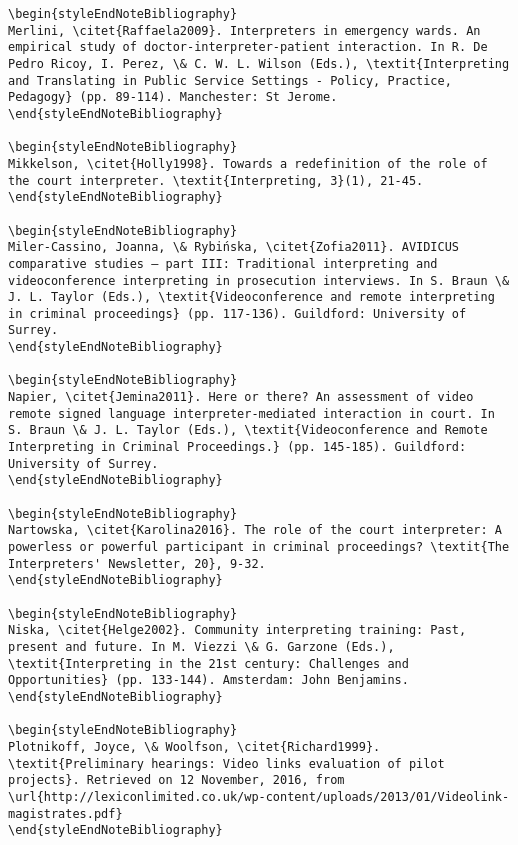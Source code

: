 \documentclass[output=paper]{langsci/langscibook}
\begin{document}
\begin{verbatim}
\begin{styleEndNoteBibliography}
Merlini, \citet{Raffaela2009}. Interpreters in emergency wards. An empirical study of doctor-interpreter-patient interaction. In R. De Pedro Ricoy, I. Perez, \& C. W. L. Wilson (Eds.), \textit{Interpreting and Translating in Public Service Settings - Policy, Practice, Pedagogy} (pp. 89-114). Manchester: St Jerome.
\end{styleEndNoteBibliography}

\begin{styleEndNoteBibliography}
Mikkelson, \citet{Holly1998}. Towards a redefinition of the role of the court interpreter. \textit{Interpreting, 3}(1), 21-45. 
\end{styleEndNoteBibliography}

\begin{styleEndNoteBibliography}
Miler-Cassino, Joanna, \& Rybińska, \citet{Zofia2011}. AVIDICUS comparative studies – part III: Traditional interpreting and videoconference interpreting in prosecution interviews. In S. Braun \& J. L. Taylor (Eds.), \textit{Videoconference and remote interpreting in criminal proceedings} (pp. 117-136). Guildford: University of Surrey.
\end{styleEndNoteBibliography}

\begin{styleEndNoteBibliography}
Napier, \citet{Jemina2011}. Here or there? An assessment of video remote signed language interpreter-mediated interaction in court. In S. Braun \& J. L. Taylor (Eds.), \textit{Videoconference and Remote Interpreting in Criminal Proceedings.} (pp. 145-185). Guildford: University of Surrey.
\end{styleEndNoteBibliography}

\begin{styleEndNoteBibliography}
Nartowska, \citet{Karolina2016}. The role of the court interpreter: A powerless or powerful participant in criminal proceedings? \textit{The Interpreters' Newsletter, 20}, 9-32. 
\end{styleEndNoteBibliography}

\begin{styleEndNoteBibliography}
Niska, \citet{Helge2002}. Community interpreting training: Past, present and future. In M. Viezzi \& G. Garzone (Eds.), \textit{Interpreting in the 21st century: Challenges and Opportunities} (pp. 133-144). Amsterdam: John Benjamins.
\end{styleEndNoteBibliography}

\begin{styleEndNoteBibliography}
Plotnikoff, Joyce, \& Woolfson, \citet{Richard1999}. \textit{Preliminary hearings: Video links evaluation of pilot projects}. Retrieved on 12 November, 2016, from \url{http://lexiconlimited.co.uk/wp-content/uploads/2013/01/Videolink-magistrates.pdf}
\end{styleEndNoteBibliography}


\end{verbatim}
\end{document}
